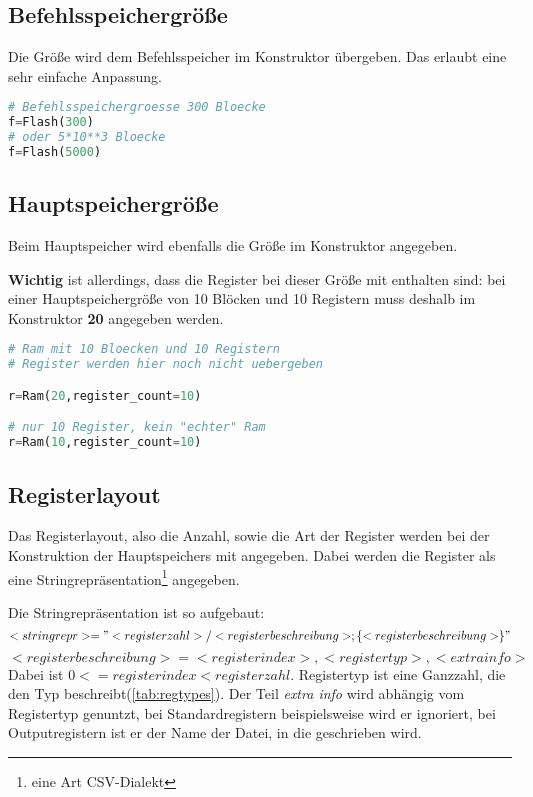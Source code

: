 \documentclass[a4paper,12pt,oneside]{scrreprt}
\begin{document}
\subsection{Befehlsspeichergröße}

Die Größe wird dem Befehlsspeicher im Konstruktor übergeben. Das erlaubt eine sehr einfache Anpassung.

\begin{lstlisting}[language=python]
# Befehlsspeichergroesse 300 Bloecke
f=Flash(300)
# oder 5*10**3 Bloecke
f=Flash(5000)
\end{lstlisting}

\subsection{Hauptspeichergröße}

Beim Hauptspeicher wird ebenfalls die Größe im Konstruktor angegeben.

\textbf{Wichtig} ist allerdings, dass die Register bei dieser Größe mit enthalten sind:
bei einer Hauptspeichergröße von 10 Blöcken und 10 Registern muss deshalb im Konstruktor \textbf{20} angegeben werden.

\begin{lstlisting}[language=python]
# Ram mit 10 Bloecken und 10 Registern
# Register werden hier noch nicht uebergeben

r=Ram(20,register_count=10)

# nur 10 Register, kein "echter" Ram
r=Ram(10,register_count=10)
\end{lstlisting}

\subsection{Registerlayout}

Das Registerlayout, also die Anzahl, sowie die Art der Register werden bei der Konstruktion der Hauptspeichers mit angegeben.
Dabei werden die Register als eine Stringrepräsentation\footnote{eine Art CSV-Dialekt} angegeben.

Die Stringrepräsentation ist so aufgebaut:
$$ <stringrepr> = "<register zahl>/<registerbeschreibung>;\{<registerbeschreibung>\}" $$
$$ <registerbeschreibung> = <registerindex>,<registertyp>,<extra info> $$
Dabei ist $ 0 <= registerindex < registerzahl $. Registertyp ist eine Ganzzahl, die den Typ beschreibt(\ref{tab:regtypes}).
Der Teil \textit{extra info} wird abhängig vom Registertyp genuntzt, bei Standardregistern beispielsweise wird er 
ignoriert, bei Outputregistern ist er der Name der Datei, in die geschrieben wird.
\end{document}
